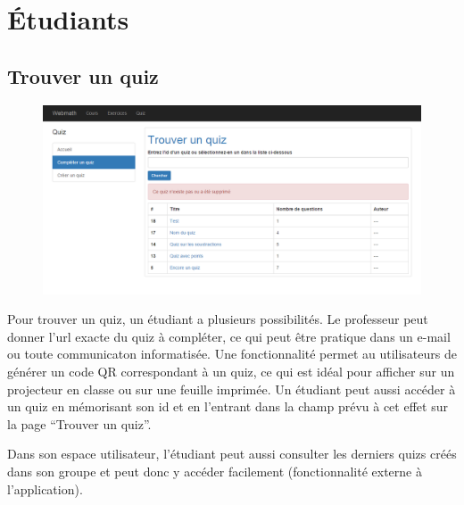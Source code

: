 \documentclass[letterpaper,10pt,french]{sphinxmanual}
\begin{document}
\section{Étudiants}
\label{functionalities:etudiants}

\subsection{Trouver un quiz}
\label{functionalities:trouver-un-quiz}\begin{figure}[htbp]
\centering

\includegraphics{find.png}
\end{figure}

Pour trouver un quiz, un étudiant a plusieurs possibilités. Le professeur peut donner l'url exacte du quiz à compléter, ce qui peut être pratique dans un e-mail ou toute communicaton informatisée. Une fonctionnalité permet au utilisateurs de générer un code QR correspondant à un quiz, ce qui est idéal pour afficher sur un projecteur en classe ou sur une feuille imprimée. Un étudiant peut aussi accéder à un quiz en mémorisant son id et en l'entrant dans la champ prévu à cet effet sur la page ``Trouver un quiz''.

Dans son espace utilisateur, l'étudiant peut aussi consulter les derniers quizs créés dans son groupe et peut donc y accéder facilement (fonctionnalité externe à l'application).
\end{document}
